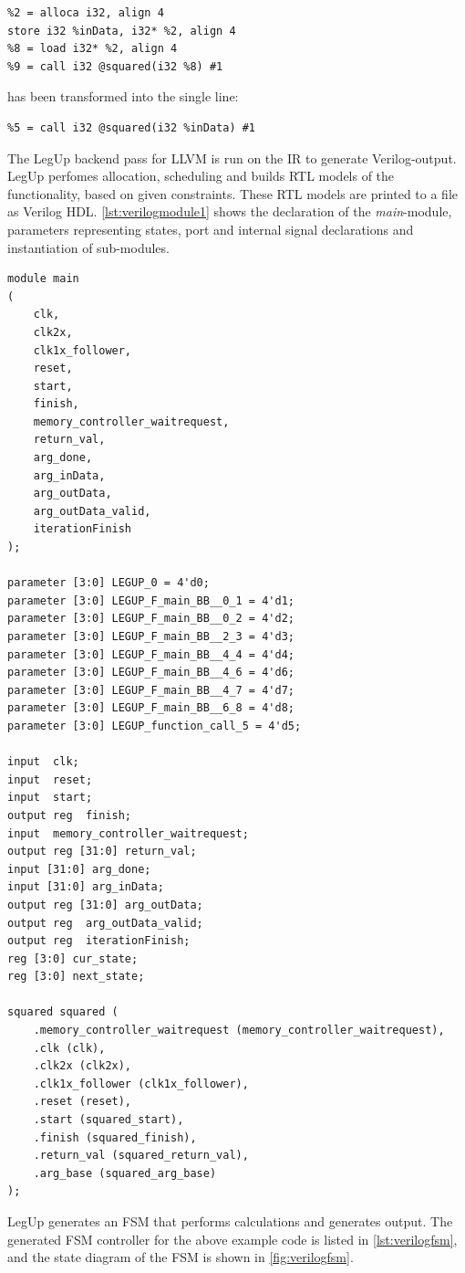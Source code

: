 \begin{lstlisting}
%2 = alloca i32, align 4
store i32 %inData, i32* %2, align 4
%8 = load i32* %2, align 4
%9 = call i32 @squared(i32 %8) #1
\end{lstlisting}
has been transformed into the single line:
\begin{lstlisting}
%5 = call i32 @squared(i32 %inData) #1
\end{lstlisting}
The LegUp backend pass for LLVM is run on the IR to generate Verilog-output. LegUp perfomes allocation, scheduling and builds RTL models of the functionality, based on given constraints. These RTL models are printed to a file as Verilog HDL. \cref{lst:verilogmodule1} shows the declaration of the \textit{main}-module, parameters representing states, port and internal signal declarations and instantiation of sub-modules.
\lstset{language=Verilog, style=VerilogStyle}
\begin{lstlisting}[caption={Verilog module, port, signal and parameter declaration, and sub-module instantiation},label=lst:verilogmodule1]
module main
(
	clk,
	clk2x,
	clk1x_follower,
	reset,
	start,
	finish,
	memory_controller_waitrequest,
	return_val,
	arg_done,
	arg_inData,
	arg_outData,
	arg_outData_valid,
	iterationFinish
);

parameter [3:0] LEGUP_0 = 4'd0;
parameter [3:0] LEGUP_F_main_BB__0_1 = 4'd1;
parameter [3:0] LEGUP_F_main_BB__0_2 = 4'd2;
parameter [3:0] LEGUP_F_main_BB__2_3 = 4'd3;
parameter [3:0] LEGUP_F_main_BB__4_4 = 4'd4;
parameter [3:0] LEGUP_F_main_BB__4_6 = 4'd6;
parameter [3:0] LEGUP_F_main_BB__4_7 = 4'd7;
parameter [3:0] LEGUP_F_main_BB__6_8 = 4'd8;
parameter [3:0] LEGUP_function_call_5 = 4'd5;

input  clk;
input  reset;
input  start;
output reg  finish;
input  memory_controller_waitrequest;
output reg [31:0] return_val;
input [31:0] arg_done;
input [31:0] arg_inData;
output reg [31:0] arg_outData;
output reg  arg_outData_valid;
output reg  iterationFinish;
reg [3:0] cur_state;
reg [3:0] next_state;

squared squared (
	.memory_controller_waitrequest (memory_controller_waitrequest),
	.clk (clk),
	.clk2x (clk2x),
	.clk1x_follower (clk1x_follower),
	.reset (reset),
	.start (squared_start),
	.finish (squared_finish),
	.return_val (squared_return_val),
	.arg_base (squared_arg_base)
);
\end{lstlisting}
LegUp generates an FSM that performs calculations and generates output. The generated FSM controller for the above example code is listed in \cref{lst:verilogfsm}, and the state diagram of the FSM is shown in \cref{fig:verilogfsm}.
